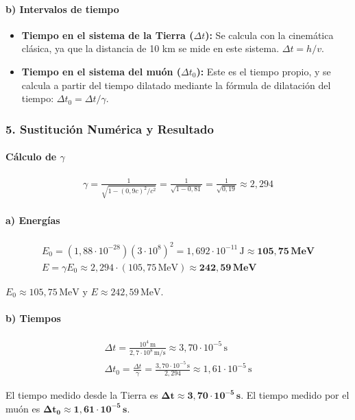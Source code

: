 \paragraph*{b) Intervalos de tiempo}
\begin{itemize}
    \item \textbf{Tiempo en el sistema de la Tierra ($\Delta t$):} Se calcula con la cinemática clásica, ya que la distancia de 10 km se mide en este sistema. $\Delta t = h/v$.
    \item \textbf{Tiempo en el sistema del muón ($\Delta t_0$):} Este es el tiempo propio, y se calcula a partir del tiempo dilatado mediante la fórmula de dilatación del tiempo: $\Delta t_0 = \Delta t / \gamma$.
\end{itemize}

\subsubsection*{5. Sustitución Numérica y Resultado}
\paragraph*{Cálculo de $\gamma$}
\begin{gather}
    \gamma = \frac{1}{\sqrt{1 - (0,9c)^2/c^2}} = \frac{1}{\sqrt{1 - 0,81}} = \frac{1}{\sqrt{0,19}} \approx 2,294
\end{gather}
\paragraph*{a) Energías}
\begin{gather}
    E_0 = (1,88\cdot10^{-28})(3\cdot10^8)^2 = 1,692\cdot10^{-11} \, \text{J} \approx \boldsymbol{105,75 \, \textbf{MeV}} \\
    E = \gamma E_0 \approx 2,294 \cdot (105,75 \, \text{MeV}) \approx \boldsymbol{242,59 \, \textbf{MeV}}
\end{gather}
\begin{cajaresultado}
$E_0 \approx 105,75\,\text{MeV}$ y $E \approx 242,59\,\text{MeV}$.
\end{cajaresultado}
\paragraph*{b) Tiempos}
\begin{gather}
    \Delta t = \frac{10^4 \, \text{m}}{2,7\cdot10^8 \, \text{m/s}} \approx 3,70 \cdot 10^{-5} \, \text{s} \\
    \Delta t_0 = \frac{\Delta t}{\gamma} = \frac{3,70 \cdot 10^{-5} \, \text{s}}{2,294} \approx 1,61 \cdot 10^{-5} \, \text{s}
\end{gather}
\begin{cajaresultado}
El tiempo medido desde la Tierra es $\boldsymbol{\Delta t \approx 3,70 \cdot 10^{-5} \, \textbf{s}}$. El tiempo medido por el muón es $\boldsymbol{\Delta t_0 \approx 1,61 \cdot 10^{-5} \, \textbf{s}}$.
\end{cajaresultado}

